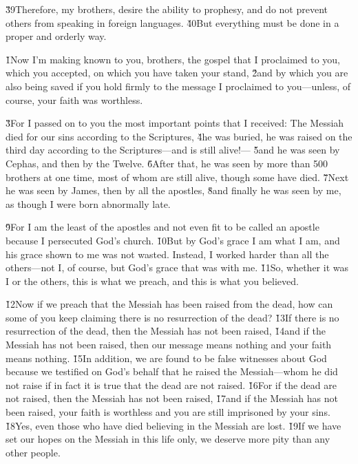 \v{39}Therefore, my brothers, desire the ability to prophesy, and do not prevent others from speaking in foreign languages. \v{40}But everything must be done in a proper and orderly way.

\v{1}Now I'm making known to you, brothers, the gospel that I proclaimed to you, which you accepted, on which you have taken your stand, \v{2}and by which you are also being saved if you hold firmly to the message I proclaimed to you---unless, of course, your faith was worthless.

\v{3}For I passed on to you the most important points that I received: The Messiah died for our sins according to the Scriptures, \v{4}he was buried, he was raised on the third day according to the Scriptures---and is still alive!--- \v{5}and he was seen by Cephas, and then by the Twelve. \v{6}After that, he was seen by more than 500 brothers at one time, most of whom are still alive, though some have died. \v{7}Next he was seen by James, then by all the apostles, \v{8}and finally he was seen by me, as though I were born abnormally late.

\v{9}For I am the least of the apostles and not even fit to be called an apostle because I persecuted God's church. \v{10}But by God's grace I am what I am, and his grace shown to me was not wasted. Instead, I worked harder than all the others---not I, of course, but God's grace that was with me. \v{11}So, whether it was I or the others, this is what we preach, and this is what you believed.

\v{12}Now if we preach that the Messiah has been raised from the dead, how can some of you keep claiming there is no resurrection of the dead? \v{13}If there is no resurrection of the dead, then the Messiah has not been raised, \v{14}and if the Messiah has not been raised, then our message means nothing and your faith means nothing. \v{15}In addition, we are found to be false witnesses about God because we testified on God's behalf that he raised the Messiah---whom he did not raise if in fact it is true that the dead are not raised. \v{16}For if the dead are not raised, then the Messiah has not been raised, \v{17}and if the Messiah has not been raised, your faith is worthless and you are still imprisoned by your sins. \v{18}Yes, even those who have died believing in the Messiah are lost. \v{19}If we have set our hopes on the Messiah in this life only, we deserve more pity than any other people.

